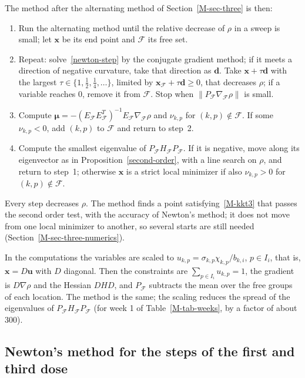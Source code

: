 The method after the alternating method of Section~\ref{M-sec-three} is then:
\begin{enumerate}
\item Run the alternating method until the relative decrease of $\rho$ in a
sweep is small; let $\bm x$ be its end point and $\mathcal F$ its free set.
\item Repeat: solve~\eqref{newton-step} by the conjugate gradient method; if it
meets a direction of negative curvature, take that direction as $\bm d$. Take
$\bm x+\tau\bm d$ with the largest $\tau\in\{1,\frac12,\frac14,\ldots\}$,
limited by $\bm x_{\mathcal F}+\tau\bm d\ge 0$, that decreases $\rho$; if a
variable reaches $0$, remove it from $\mathcal F$. Stop when
$\left\|P_{\mathcal F}\nabla_{\mathcal F}\rho\right\|$ is small.
\item Compute $\bm\mu=-\left(E_{\mathcal F}E_{\mathcal F}^T\right)^{-1}E_{\mathcal F}\nabla_{\mathcal F}\rho$
and $\nu_{k,p}$ for $(k,p)\notin\mathcal F$. If some $\nu_{k,p}<0$, add
$(k,p)$ to $\mathcal F$ and return to step~2.
\item Compute the smallest eigenvalue of $P_{\mathcal F}H_{\mathcal F}P_{\mathcal F}$.
If it is negative, move along its eigenvector as in
Proposition~\ref{second-order}, with a line search on $\rho$, and return to
step~1; otherwise $\bm x$ is a strict local minimizer if also
$\nu_{k,p}>0$ for $(k,p)\notin\mathcal F$.
\end{enumerate}
Every step decreases $\rho$. The method finds a point satisfying~\eqref{M-kkt3}
that passes the second order test, with the accuracy of Newton's method; it
does not move from one local minimizer to another, so several starts are
still needed (Section~\ref{M-sec-three-numerics}).

In the computations the variables are scaled to
$u_{k,p}=\sigma_{k,p}\chi_{k,p}/b_{k,i}$, $p\in I_i$, that is, $\bm x=D\bm u$ with
$D$ diagonal. Then the constraints are $\sum_{p\in I_i}u_{k,p}=1$, the gradient
is $D\nabla\rho$ and the Hessian $DHD$, and $P_{\mathcal F}$ subtracts the mean
over the free groups of each location. The method is the same; the scaling
reduces the spread of the eigenvalues of $P_{\mathcal F}H_{\mathcal F}P_{\mathcal F}$
(for week 1 of Table~\ref{M-tab-weeks}, by a factor of about $300$).

\subsection{Newton's method for the steps of the first and third dose}\label{app-newton-step13}

